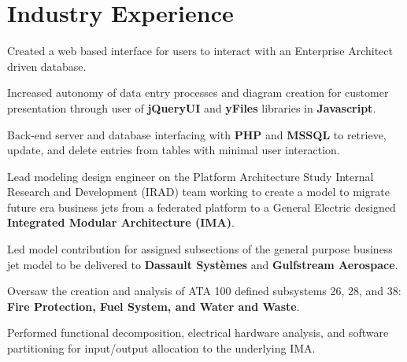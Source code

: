 \documentclass[letterpaper]{deedy-resume} %
\begin{document}
\begin{minipage}[t]{0.66\textwidth} %


\section{Industry Experience}



\vspace{\topsep} %
\begin{tightitemize}
\item Created a web based interface for users to interact with an Enterprise Architect driven database.
\item Increased autonomy of data entry processes and diagram creation for customer presentation through user of \textbf{jQueryUI} and \textbf{yFiles} libraries in \textbf{Javascript}.
\item Back-end server and database interfacing with \textbf{PHP} and \textbf{MSSQL} to retrieve, 
update, and delete entries from tables with minimal user interaction.
\end{tightitemize}

\begin{tightitemize}
\item Lead modeling design engineer on the Platform Architecture Study Internal Research and Development (IRAD) team working to create a model to migrate future era business jets from a federated platform to a General Electric designed \textbf{Integrated Modular Architecture (IMA)}. 
\item Led model contribution for assigned subsections of the general purpose business jet model to be delivered to \textbf{Dassault Systèmes} and \textbf{Gulfstream Aerospace}.
\item Oversaw the creation and analysis of ATA 100 defined subsystems 26, 28, and 38: \textbf{Fire Protection, Fuel System, and Water and Waste}.
\item Performed functional decomposition, electrical hardware analysis, and software partitioning for input/output allocation to the underlying IMA.
\end{tightitemize}


\end{minipage}
\end{document}
